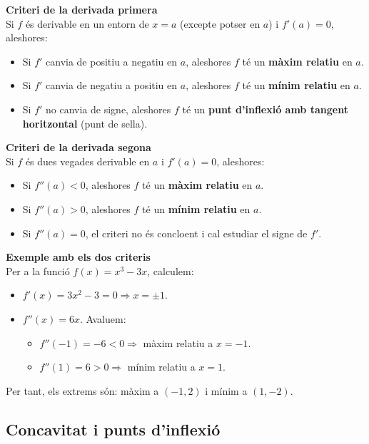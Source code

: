 \documentclass[12pt]{article}
\begin{document}
\begin{concept}
\textbf{Criteri de la derivada primera}\\
Si $f$ és derivable en un entorn de $x=a$ (excepte potser en $a$) i $f'(a)=0$, aleshores:
\begin{itemize}
    \item Si $f'$ canvia de positiu a negatiu en $a$, aleshores $f$ té un \textbf{màxim relatiu} en $a$.
    \item Si $f'$ canvia de negatiu a positiu en $a$, aleshores $f$ té un \textbf{mínim relatiu} en $a$.
    \item Si $f'$ no canvia de signe, aleshores $f$ té un \textbf{punt d'inflexió amb tangent horitzontal} (punt de sella).
\end{itemize}

\textbf{Criteri de la derivada segona}\\
Si $f$ és dues vegades derivable en $a$ i $f'(a)=0$, aleshores:
\begin{itemize}
    \item Si $f''(a)<0$, aleshores $f$ té un \textbf{màxim relatiu} en $a$.
    \item Si $f''(a)>0$, aleshores $f$ té un \textbf{mínim relatiu} en $a$.
    \item Si $f''(a)=0$, el criteri no és concloent i cal estudiar el signe de $f'$.
\end{itemize}
\end{concept}

\begin{exemple}
\textbf{Exemple amb els dos criteris}\\
Per a la funció $f(x)=x^3-3x$, calculem:
\begin{itemize}
    \item $f'(x)=3x^2-3=0 \Rightarrow x=\pm1$.
    \item $f''(x)=6x$. Avaluem:
        \begin{itemize}
            \item $f''(-1)=-6<0 \Rightarrow$ màxim relatiu a $x=-1$.
            \item $f''(1)=6>0 \Rightarrow$ mínim relatiu a $x=1$.
        \end{itemize}
\end{itemize}
Per tant, els extrems són: màxim a $(-1,2)$ i mínim a $(1,-2)$.
\end{exemple}

\subsection{Concavitat i punts d'inflexió}
\end{document}
